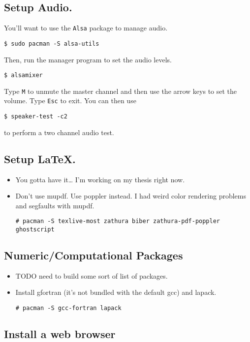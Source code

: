 \documentclass{article}
\begin{document}
  \subsection{Setup Audio.}

    You'll want to use the \verb|Alsa| package to manage audio.
\begin{verbatim}
$ sudo pacman -S alsa-utils
\end{verbatim}
    Then, run the manager program to set the audio levels.
\begin{verbatim}
$ alsamixer
\end{verbatim}
    Type \verb|M| to unmute the master channel and then use the arrow keys to set the volume.
    Type \verb|Esc| to exit.
    You can then use 
\begin{verbatim}
$ speaker-test -c2
\end{verbatim}
    to perform a two channel audio test.

  \subsection{Setup \LaTeX.}

  \begin{itemize}
    \item You gotta have it\ldots{} I'm working on my thesis right now.
    \item Don't use mupdf.
      Use poppler instead.
      I had weird color rendering problems and segfaults with mupdf.
\begin{verbatim}
# pacman -S texlive-most zathura biber zathura-pdf-poppler ghostscript
\end{verbatim}
  \end{itemize}

  \subsection{Numeric/Computational Packages}

  \begin{itemize}
    \item TODO need to build some sort of list of packages.
    \item Install gfortran (it's not bundled with the default gcc) and lapack.
\begin{verbatim}
# pacman -S gcc-fortran lapack
\end{verbatim}
  \end{itemize}

  \subsection{Install a web browser}
\end{document}
